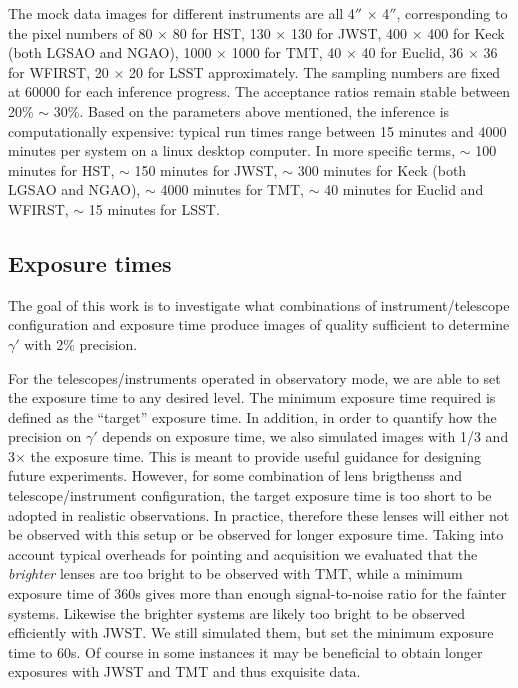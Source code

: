 \documentclass[a4paper,11pt]{article}
\begin{document}
The mock data images for different instruments are all 4$''$ $\times$
4$''$, corresponding to the pixel numbers of 80 $\times$ 80 for HST,
130 $\times$ 130 for JWST, 400 $\times$ 400 for Keck (both LGSAO and
NGAO), 1000 $\times$ 1000 for TMT, 40 $\times$ 40 for Euclid, 36
$\times$ 36 for WFIRST, 20 $\times$ 20 for LSST approximately. The sampling
numbers are fixed at 60000 for each inference progress.
The acceptance ratios remain stable between 20\% $\sim$ 30\%.
Based on the parameters above mentioned, the inference is computationally expensive: typical run times range
between 15 minutes and 4000 minutes per system on a
linux desktop computer. In more specific terms, $\sim$ 100 minutes for HST,
$\sim$ 150 minutes for JWST, $\sim$ 300 minutes for Keck (both LGSAO and NGAO),
$\sim$ 4000 minutes for TMT, $\sim$ 40 minutes for Euclid and WFIRST, $\sim$ 15 minutes for LSST.

\subsection{Exposure times}

The goal of this work is to investigate what combinations of
instrument/telescope configuration and exposure time produce images of
quality sufficient to determine $\gamma'$ with 2\% precision.

For the telescopes/instruments operated in observatory mode, we are
able to set the exposure time to any desired level. The minimum
exposure time required is defined as the ``target'' exposure time. In
addition, in order to quantify how the precision on $\gamma'$ depends
on exposure time, we also simulated images with 1/3 and 3$\times$ the
exposure time. This is meant to provide useful guidance for designing
future experiments. However, for some combination of lens brigthenss
and telescope/instrument configuration, the target exposure time is too
short to be adopted in realistic observations. In practice, therefore
these lenses will either not be observed with this setup or be
observed for longer exposure time. Taking into account typical
overheads for pointing and acquisition we evaluated that the {\it
brighter} lenses are too bright to be observed with TMT, while a
minimum exposure time of 360s gives more than enough signal-to-noise
ratio for the fainter systems. Likewise the brighter systems are
likely too bright to be observed efficiently with JWST. We still
simulated them, but set the minimum exposure time to 60s. Of course in
some instances it may be beneficial to obtain longer exposures with
JWST and TMT and thus exquisite data.
\end{document}
